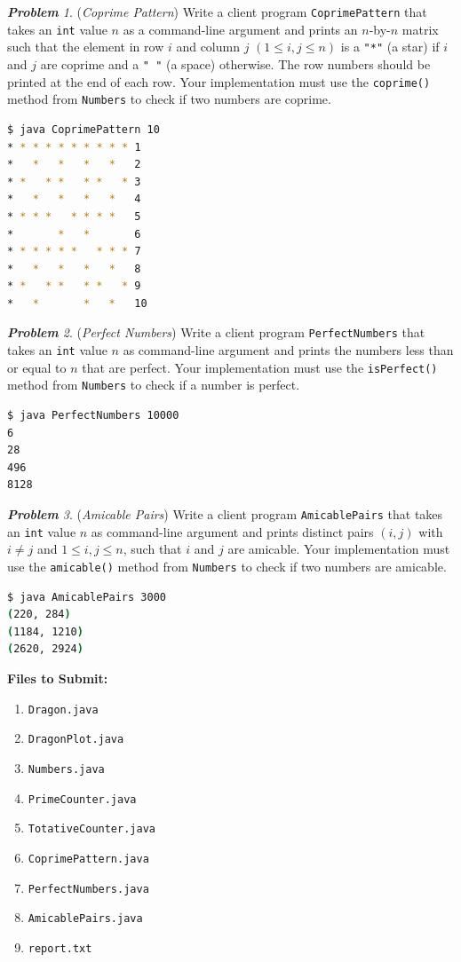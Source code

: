\documentclass[a4paper, 12pt]{article}
\newcommand{\tbf}{\textbf}
\newcommand{\tit}{\textit}
\theoremstyle{remark}
\newtheorem{problem}{\normalfont \bfseries Problem}
\begin{document}
\begin{problem}
(\tit{Coprime Pattern}) Write a client program \lstinline$CoprimePattern$ that takes an \lstinline$int$ value $n$ as a command-line argument and prints an $n$-by-$n$ matrix such that the
element in row $i$ and column $j$ $(1 \leq i, j \leq n)$ is a \lstinline$"*"$ (a star) if $i$ and $j$ are coprime and a \lstinline$" "$ (a space) otherwise. The row numbers should be
printed at the end of each row. Your implementation must use the \lstinline$coprime()$ method from \lstinline$Numbers$ to check if two numbers are coprime.

\begin{lstlisting}[language=bash]
$ java CoprimePattern 10
* * * * * * * * * * 1
*   *   *   *   *   2
* *   * *   * *   * 3
*   *   *   *   *   4
* * * *   * * * *   5
*       *   *       6
* * * * * *   * * * 7
*   *   *   *   *   8
* *   * *   * *   * 9
*   *       *   *   10
\end{lstlisting}
\end{problem}

\begin{problem}
(\tit{Perfect Numbers}) Write a client program \lstinline$PerfectNumbers$ that takes an \lstinline$int$ value $n$ as command-line argument and prints the numbers less than or equal to $n$ that are perfect. Your implementation must use the \lstinline$isPerfect()$ method from \lstinline$Numbers$ to check if a number is perfect.

\begin{lstlisting}[language=bash]
$ java PerfectNumbers 10000
6
28
496
8128
\end{lstlisting}
\end{problem}

\begin{problem}
(\tit{Amicable Pairs}) Write a client program \lstinline$AmicablePairs$ that takes an \lstinline$int$ value $n$ as command-line argument and prints distinct pairs $(i, j)$ with $i \neq j$ and $1 \leq i, j \leq n$, such that $i$ and $j$ are amicable. Your implementation must use the \lstinline$amicable()$ method from \lstinline$Numbers$ to check if two numbers are amicable.

\begin{lstlisting}[language=bash]
$ java AmicablePairs 3000
(220, 284)
(1184, 1210)
(2620, 2924)
\end{lstlisting}
\end{problem}

\noindent \tbf{Files to Submit:}
\begin{enumerate}
\itemsep0em
\item \lstinline$Dragon.java$
\item \lstinline$DragonPlot.java$
\item \lstinline$Numbers.java$
\item \lstinline$PrimeCounter.java$
\item \lstinline$TotativeCounter.java$
\item \lstinline$CoprimePattern.java$
\item \lstinline$PerfectNumbers.java$
\item \lstinline$AmicablePairs.java$
\item \lstinline$report.txt$
\end{enumerate}
\end{document}
